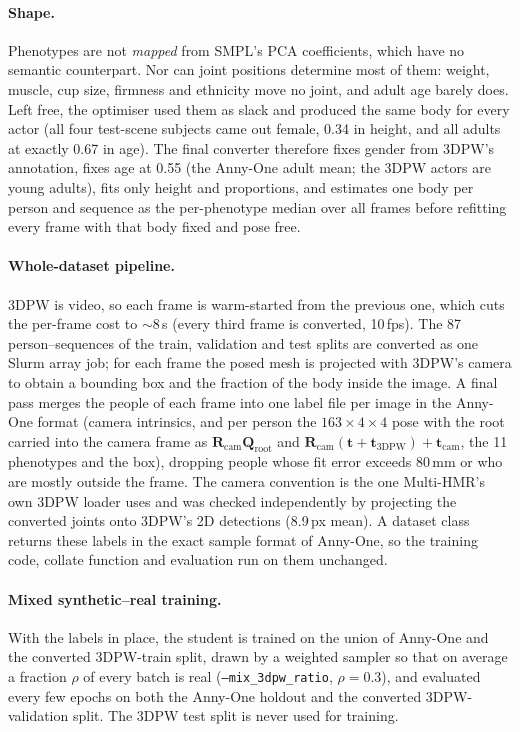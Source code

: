 \paragraph{Shape.} Phenotypes are not \emph{mapped} from SMPL's PCA
coefficients, which have no semantic counterpart. Nor can joint positions
determine most of them: weight, muscle, cup size, firmness and ethnicity move
no joint, and adult age barely does. Left free, the optimiser used them as
slack and produced the same body for every actor (all four test-scene
subjects came out female, 0.34 in height, and all adults at exactly 0.67 in
age). The final converter therefore fixes gender from 3DPW's annotation, fixes
age at 0.55 (the Anny-One adult mean; the 3DPW actors are young adults),
fits only height and proportions, and estimates one body per person and
sequence as the per-phenotype median over all frames before refitting every
frame with that body fixed and pose free.

\paragraph{Whole-dataset pipeline.} 3DPW is video, so each frame is
warm-started from the previous one, which cuts the per-frame cost to
$\sim$8\,s (every third frame is converted, 10\,fps). The 87
person--sequences of the train, validation and test splits are converted as
one Slurm array job; for each frame the posed mesh is projected with 3DPW's
camera to obtain a bounding box and the fraction of the body inside the
image. A final pass merges the people of each frame into one label file per
image in the Anny-One format (camera intrinsics, and per person the
$163{\times}4{\times}4$ pose with the root carried into the camera frame as
$\mathbf{R}_{\text{cam}}\mathbf{Q}_{\text{root}}$ and
$\mathbf{R}_{\text{cam}}(\mathbf{t}+\mathbf{t}_{\text{3DPW}})+\mathbf{t}_{\text{cam}}$,
the 11 phenotypes and the box), dropping people whose fit error exceeds
80\,mm or who are mostly outside the frame. The camera convention is the one
Multi-HMR's own 3DPW loader uses and was checked independently by projecting
the converted joints onto 3DPW's 2D detections (8.9\,px mean). A dataset class
returns these labels in the exact sample format of Anny-One, so the training
code, collate function and evaluation run on them unchanged.

\paragraph{Mixed synthetic--real training.} With the labels in place, the
student is trained on the union of Anny-One and the converted 3DPW-train
split, drawn by a weighted sampler so that on average a fraction $\rho$ of
every batch is real (\texttt{--mix\_3dpw\_ratio}, $\rho{=}0.3$), and evaluated
every few epochs on both the Anny-One holdout and the converted
3DPW-validation split. The 3DPW test split is never used for training.

